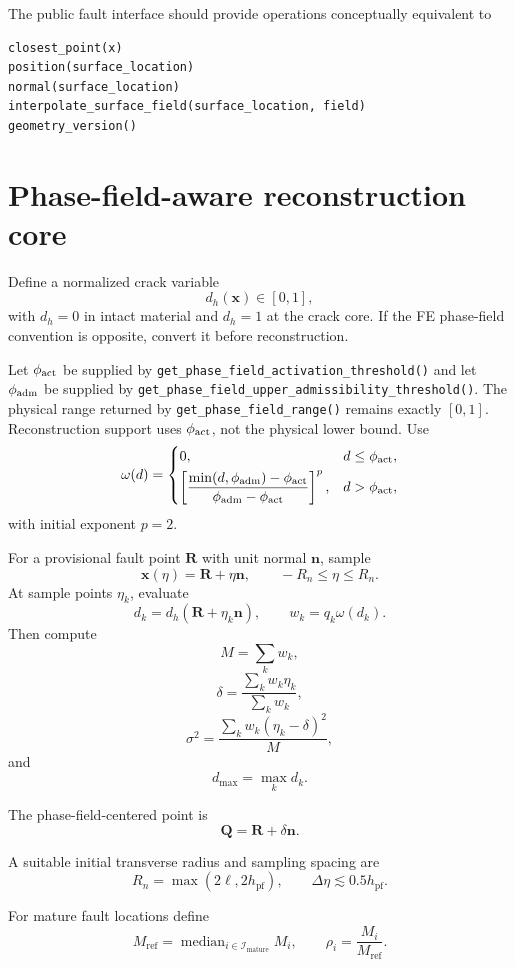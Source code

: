 \documentclass[11pt]{article}
\newcommand{\wh}{\omega}
\begin{document}
The public fault interface should provide operations conceptually equivalent to
\begin{lstlisting}
closest_point(x)
position(surface_location)
normal(surface_location)
interpolate_surface_field(surface_location, field)
geometry_version()
\end{lstlisting}

\section{Phase-field-aware reconstruction core}

Define a normalized crack variable
\[
d_h(\mathbf{x})\in[0,1],
\]
with $d_h=0$ in intact material and $d_h=1$ at the crack core.  If the FE phase-field convention is opposite, convert it before reconstruction.

Let \(\phi_{\rm act}\) be supplied by
\texttt{get\_phase\_field\_activation\_threshold()} and let
\(\phi_{\rm adm}\) be supplied by
\texttt{get\_phase\_field\_upper\_admissibility\_threshold()}.
The physical range returned by
\texttt{get\_phase\_field\_range()} remains exactly \([0,1]\).
Reconstruction support uses \(\phi_{\rm act}\), not the physical lower bound.
Use
\[
\wh(d)
=
\begin{cases}
0, & d\le \phi_{\rm act},\\[1mm]
\left[
\dfrac{\min(d,\phi_{\rm adm})-\phi_{\rm act}}
{\phi_{\rm adm}-\phi_{\rm act}}
\right]^p,
& d>\phi_{\rm act},
\end{cases}
\]
with initial exponent $p=2$.

For a provisional fault point $\mathbf{R}$ with unit normal $\mathbf{n}$, sample
\[
\mathbf{x}(\eta)=\mathbf{R}+\eta\mathbf{n},
\qquad
-R_n\le\eta\le R_n.
\]
At sample points $\eta_k$, evaluate
\[
d_k=d_h(\mathbf{R}+\eta_k\mathbf{n}),
\qquad
w_k=q_k\wh(d_k).
\]
Then compute
\[
M=\sum_k w_k,
\]
\[
\boxed{
\delta=\frac{\sum_k w_k\eta_k}{\sum_k w_k}
},
\]
\[
\boxed{
\sigma^2
=
\frac{\sum_k w_k(\eta_k-\delta)^2}{M}
},
\]
and
\[
d_{\max}=\max_k d_k.
\]

The phase-field-centered point is
\[
\boxed{
\mathbf{Q}=\mathbf{R}+\delta\mathbf{n}.
}
\]

A suitable initial transverse radius and sampling spacing are
\[
R_n=\max(2\ell,2h_{\mathrm{pf}}),
\qquad
\Delta\eta\lesssim0.5h_{\mathrm{pf}}.
\]

For mature fault locations define
\[
M_{\mathrm{ref}}=\operatorname{median}_{i\in\mathcal I_{\mathrm{mature}}}M_i,
\qquad
\rho_i=\frac{M_i}{M_{\mathrm{ref}}}.
\]
\end{document}
